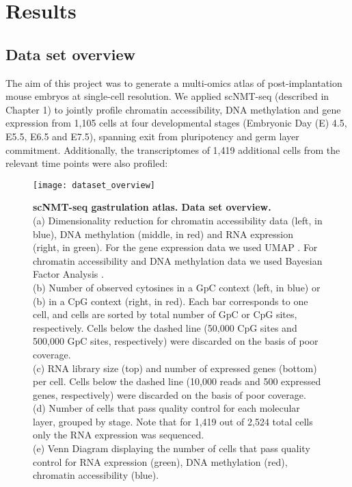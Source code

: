 \graphicspath{{Chapter3/Figs/}}

\section{Results}

\subsection{Data set overview}

The aim of this project was to generate a multi-omics atlas of post-implantation mouse embryos at single-cell resolution. We applied scNMT-seq (described in Chapter 1) to jointly profile chromatin accessibility, DNA methylation and gene expression from 1,105 cells at four developmental stages (Embryonic Day (E) 4.5, E5.5, E6.5 and E7.5), spanning exit from pluripotency and germ layer commitment. Additionally, the transcriptomes of 1,419 additional cells from the relevant time points were also profiled:

\begin{figure}[H]
	\centering
	\texttt{[image: dataset\_overview]}
	\caption[]{\textbf{scNMT-seq gastrulation atlas. Data set overview.}\\
	(a) Dimensionality reduction for chromatin accessibility data (left, in blue), DNA methylation (middle, in red) and RNA expression (right, in green). For the gene expression data we used UMAP \cite{McInnes2018}. For chromatin accessibility and DNA methylation data we used Bayesian Factor Analysis \cite{Argelaguet2018}.\\
	(b) Number of observed cytosines in a GpC context (left, in blue) or (b) in a CpG context (right, in red). Each bar corresponds to one cell, and cells are sorted by total number of GpC or CpG sites, respectively. Cells below the dashed line (50,000 CpG sites and 500,000 GpC sites, respectively) were discarded on the basis of poor coverage. \\
	(c) RNA library size (top) and number of expressed genes (bottom) per cell. Cells below the dashed line (10,000 reads and 500 expressed genes, respectively) were discarded on the basis of poor coverage. \\
	(d) Number of cells that pass quality control for each molecular layer, grouped by stage. Note that for 1,419 out of 2,524 total cells only the RNA expression was sequenced.\\
	(e) Venn Diagram displaying the number of cells that pass quality control for RNA expression (green), DNA methylation (red), chromatin accessibility (blue).
	}
	\label{fig:dataset_overview}
\end{figure}



